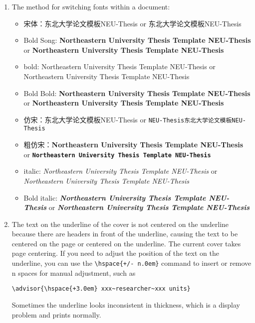 \begin{enumerate}
    \item The method for switching fonts within a document: \
        \begin{itemize}
            \item 宋体：东北大学论文模板NEU-Thesis or \textrm{东北大学论文模板NEU-Thesis}
            \item Bold Song: {\bfseries Northeastern University Thesis Template NEU-Thesis} or \textbf{Northeastern University Thesis Template NEU-Thesis}
            \item bold: {\sffamily Northeastern University Thesis Template NEU-Thesis} or \textsf{Northeastern University Thesis Template NEU-Thesis}
            \item Bold Bold: {\bfseries\sffamily Northeastern University Thesis Template NEU-Thesis} or \textsf{\bfseries Northeastern University Thesis Template NEU-Thesis}
            \item 仿宋：{\ttfamily 东北大学论文模板NEU-Thesis} or \texttt{NEU-Thesis东北大学论文模板NEU-Thesis}
            \item 粗仿宋：{\bfseries\ttfamily Northeastern University Thesis Template NEU-Thesis} or \texttt{\bfseries Northeastern University Thesis Template NEU-Thesis}
            \item italic: {\itshape Northeastern University Thesis Template NEU-Thesis} or \textit{Northeastern University Thesis Template NEU-Thesis}
            \item Bold italic: {\bfseries\itshape Northeastern University Thesis Template NEU-Thesis} or \textit{\bfseries Northeastern University Thesis Template NEU-Thesis}
        \end{itemize}

    \item The text on the underline of the cover is not centered on the underline because there are headers in front of the underline, causing the text to be centered on the page or centered on the underline. The current cover takes page centering. If you need to adjust the position of the text on the underline, you can use the \verb|\hspace{+/- n.0em}| command to insert or remove n spaces for manual adjustment, such as

        \verb|\advisor{\hspace{+3.0em} xxx~researcher~xxx units}|
                
    Sometimes the underline looks inconsistent in thickness, which is a display problem and prints normally.

\end{enumerate}


